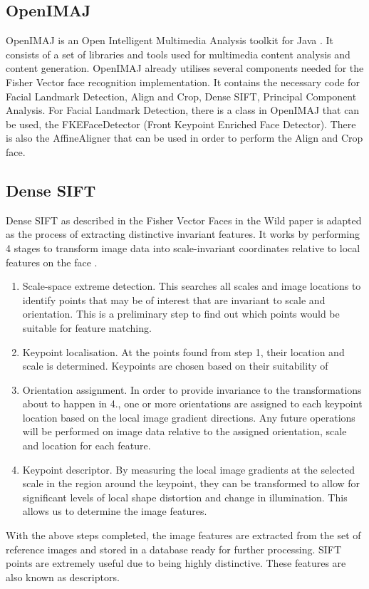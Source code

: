 \documentclass[12pt, a4paper]{article}
\begin{document}
\subsection{OpenIMAJ}
OpenIMAJ is an Open Intelligent Multimedia Analysis toolkit for Java \cite{openimaj}. It consists of a set of libraries and tools used for multimedia content analysis and content generation. OpenIMAJ already utilises several components needed for the Fisher Vector face recognition implementation. It contains the necessary code for Facial Landmark Detection, Align and Crop,  Dense SIFT, Principal Component Analysis. 
For Facial Landmark Detection, there is a class in OpenIMAJ that can be used, the FKEFaceDetector (Front Keypoint Enriched Face Detector). There is also the AffineAligner that can be used in order to perform the Align and Crop face. 

\subsection{Dense SIFT}
Dense SIFT as described in the Fisher Vector Faces in the Wild paper is adapted as the process of extracting distinctive invariant features. It works by performing 4 stages to transform image data into scale-invariant coordinates relative to local features on the face \cite{denseSift}.
\begin{enumerate}
\item Scale-space extreme detection. This searches all scales and image locations to identify points that may be of interest that are invariant to scale and orientation. This is a preliminary step to find out which points would be suitable for feature matching.
\item Keypoint localisation. At the points found from step 1, their location and scale is determined. Keypoints are chosen based on their suitability of
\item Orientation assignment. In order to provide invariance to the transformations about to happen in 4., one or more orientations are assigned to each keypoint location based on the local image gradient directions. Any future operations will be performed on image data relative to the assigned orientation, scale and location for each feature.
\item Keypoint descriptor. By measuring the local image gradients at the selected scale in the region around the keypoint, they can be transformed to allow for significant levels of local shape distortion and change in illumination. This allows us to determine the image features.
\end{enumerate}
With the above steps completed, the image features are extracted from the set of reference images and stored in a database ready for further processing. SIFT points are extremely useful due to being highly distinctive. These features are also known as descriptors.
\end{document}
